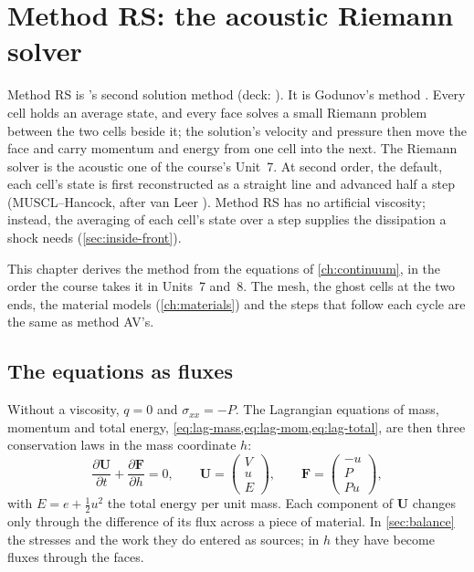 \chapter{Method RS: the acoustic Riemann solver}
\label{ch:method-rs}


Method RS is \bw's second solution method (deck: ). It is
Godunov's method \cite{godunov1959}. Every cell holds an average state, and
every face solves a small Riemann problem between the two cells beside it;
the solution's velocity and pressure then move the face and carry momentum
and energy from one cell into the next. The Riemann solver is the acoustic
one of the course's Unit~7. At second order, the default, each cell's state
is first reconstructed as a straight line and advanced half a step
(MUSCL--Hancock, after van Leer \cite{vanleer1979}). Method RS has no
artificial viscosity; instead, the averaging of each cell's state over a
step supplies the dissipation a shock needs (\cref{sec:inside-front}).

This chapter derives the method from the equations of \cref{ch:continuum},
in the order the course takes it in Units~7 and~8. The
mesh, the ghost cells at the two ends, the material models
(\cref{ch:materials}) and the steps that follow each cycle are the same as
method AV's.

\section{The equations as fluxes}
\label{sec:rs-fluxes}

Without a viscosity, $q = 0$ and $\sigma_{xx} = -P$. The Lagrangian
equations of mass, momentum and total energy,
\cref{eq:lag-mass,eq:lag-mom,eq:lag-total}, are then three conservation laws
in the mass coordinate $h$:
\begin{equation}
\frac{\partial \mathbf{U}}{\partial t} + \frac{\partial \mathbf{F}}{\partial h} = 0,
\qquad
\mathbf{U} = \begin{pmatrix} V \\ u \\ E \end{pmatrix},
\qquad
\mathbf{F} = \begin{pmatrix} -u \\ P \\ P u \end{pmatrix},
\label{eq:rs-conservation}
\end{equation}
with $E = e + \tfrac{1}{2}u^2$ the total energy per unit mass. Each
component of $\mathbf{U}$ changes only through the difference of its flux
across a piece of material. In \cref{sec:balance} the stresses and the work
they do entered as sources; in $h$ they have become fluxes through the
faces.

